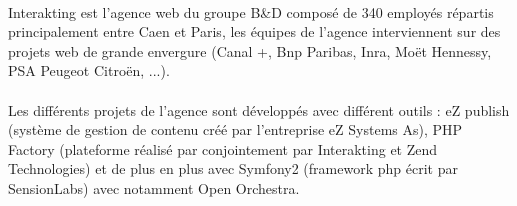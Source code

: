         \paragraph{}
        Interakting est l'agence web du groupe B\&D  composé de 340 employés répartis principalement entre Caen et Paris, les équipes de l'agence interviennent sur des projets web  de grande envergure (Canal +, Bnp Paribas, Inra, Moët Hennessy, PSA Peugeot Citroën, ...).
        
         \paragraph{}
        Les différents projets de l'agence sont développés avec différent outils : eZ publish (système de gestion de contenu créé par l'entreprise eZ Systems As), PHP Factory (plateforme réalisé par conjointement par Interakting et Zend Technologies) et de plus en plus avec Symfony2 (framework php écrit par SensionLabs) avec notamment Open Orchestra.

        
        
        